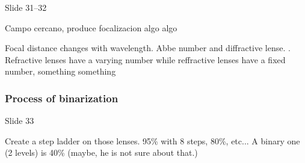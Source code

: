\documentclass[../main/main.tex]{subfiles}
\begin{document}
Slide 31--32

Campo cercano, produce focalizacion algo algo

Focal distance changes with wavelength. Abbe number and diffractive lense. . Refractive lenses have a varying number while reffractive lenses have a fixed number, something something


\subsubsection*{Process of binarization}

Slide 33

Create a step ladder on those lenses.  95\% with 8 steps, 80\%, etc... A binary one (2 levels) is 40\% (maybe, he is not sure about that.)
\end{document}
